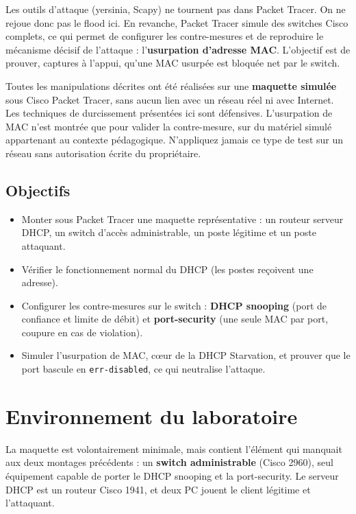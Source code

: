 \documentclass[11pt,a4paper]{article}
\begin{document}
Les outils d'attaque (yersinia, Scapy) ne tournent pas dans Packet Tracer. On ne rejoue donc
pas le flood ici. En revanche, Packet Tracer simule des switches Cisco complets, ce qui permet
de configurer les contre-mesures et de reproduire le mécanisme décisif de l'attaque :
l'\textbf{usurpation d'adresse MAC}. L'objectif est de prouver, captures à l'appui, qu'une MAC
usurpée est bloquée net par le switch.

\begin{avertissement}
Toutes les manipulations décrites ont été réalisées sur une \textbf{maquette simulée} sous
Cisco Packet Tracer, sans aucun lien avec un réseau réel ni avec Internet. Les techniques de
durcissement présentées ici sont défensives. L'usurpation de MAC n'est montrée que pour
valider la contre-mesure, sur du matériel simulé appartenant au contexte pédagogique.
N'appliquez jamais ce type de test sur un réseau sans autorisation écrite du propriétaire.
\end{avertissement}

\subsection{Objectifs}
\begin{itemize}[leftmargin=1.4em]
  \item Monter sous Packet Tracer une maquette représentative : un routeur serveur DHCP, un
        switch d'accès administrable, un poste légitime et un poste attaquant.
  \item Vérifier le fonctionnement normal du DHCP (les postes reçoivent une adresse).
  \item Configurer les contre-mesures sur le switch : \textbf{DHCP snooping} (port de confiance
        et limite de débit) et \textbf{port-security} (une seule MAC par port, coupure en cas de
        violation).
  \item Simuler l'usurpation de MAC, cœur de la DHCP Starvation, et prouver que le port
        bascule en \texttt{err-disabled}, ce qui neutralise l'attaque.
\end{itemize}

\section{Environnement du laboratoire}
La maquette est volontairement minimale, mais contient l'élément qui manquait aux deux
montages précédents : un \textbf{switch administrable} (Cisco 2960), seul équipement capable de
porter le DHCP snooping et la port-security. Le serveur DHCP est un routeur Cisco 1941, et deux
PC jouent le client légitime et l'attaquant.
\end{document}
